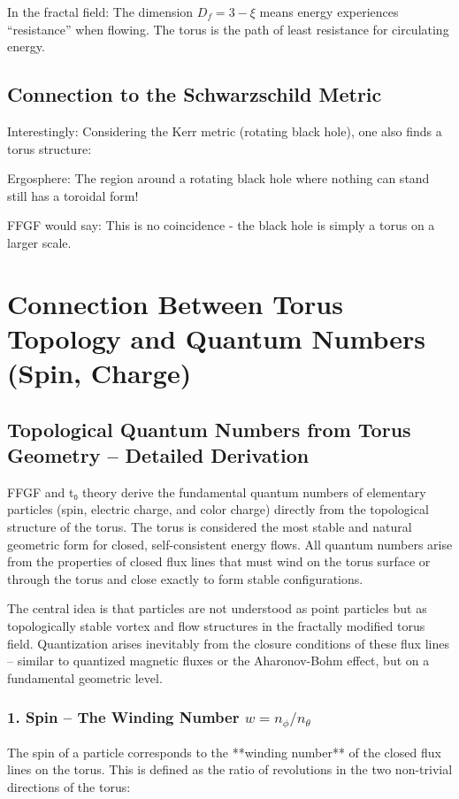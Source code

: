 In the fractal field:
The dimension \( D_f = 3 - \xi \) means energy experiences ``resistance'' when flowing. The torus is the path of least resistance for circulating energy.

\subsection{Connection to the Schwarzschild Metric}
Interestingly: Considering the Kerr metric (rotating black hole), one also finds a torus structure:

Ergosphere: The region around a rotating black hole where nothing can stand still has a toroidal form!

FFGF would say: This is no coincidence - the black hole is simply a torus on a larger scale.

\section{Connection Between Torus Topology and Quantum Numbers (Spin, Charge)}

\subsection{Topological Quantum Numbers from Torus Geometry – Detailed Derivation}

FFGF and t₀ theory derive the fundamental quantum numbers of elementary particles (spin, electric charge, and color charge) directly from the topological structure of the torus. The torus is considered the most stable and natural geometric form for closed, self-consistent energy flows. All quantum numbers arise from the properties of closed flux lines that must wind on the torus surface or through the torus and close exactly to form stable configurations.

The central idea is that particles are not understood as point particles but as topologically stable vortex and flow structures in the fractally modified torus field. Quantization arises inevitably from the closure conditions of these flux lines – similar to quantized magnetic fluxes or the Aharonov-Bohm effect, but on a fundamental geometric level.

\subsubsection{1. Spin – The Winding Number $w = n_\phi / n_\theta$}

The spin of a particle corresponds to the **winding number** of the closed flux lines on the torus. This is defined as the ratio of revolutions in the two non-trivial directions of the torus:


